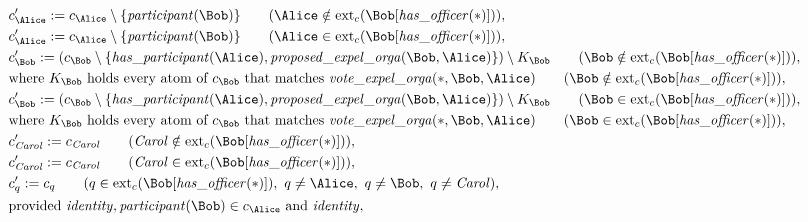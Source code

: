 \begin{align*}
&
c'_
{
\Alice
}
 := 
c_
{
\Alice
}
 \setminus 
\{
\mathit{\detokenize{
participant
}}
(
\Bob
)
\}
 \qquad (
\Alice
 \notin 
\mathrm{ext}_c(
\Bob
[
\mathit{\detokenize{
has_officer
}}
(
\ast
)
]
)
)
,\\
&
c'_
{
\Alice
}
 := 
c_
{
\Alice
}
 \setminus 
\{
\mathit{\detokenize{
participant
}}
(
\Bob
)
\}
 \qquad (
\Alice
 \in 
\mathrm{ext}_c(
\Bob
[
\mathit{\detokenize{
has_officer
}}
(
\ast
)
]
)
)
,\\
&
c'_
{
\Bob
}
 := 
(c_
{
\Bob
}
 \setminus 
\{
\mathit{\detokenize{
has_participant
}}
(
\Alice
)
,
\mathit{\detokenize{
proposed_expel_orga
}}
(
\Bob
,
\Alice
)
\}
) \setminus K_
{
\Bob
}
 \qquad (
\Bob
 \notin 
\mathrm{ext}_c(
\Bob
[
\mathit{\detokenize{
has_officer
}}
(
\ast
)
]
)
)
,\\
&
\text{where } K_
{
\Bob
}
 \text{ holds every atom of } c_
{
\Bob
}
 \text{ that matches } 
\mathit{\detokenize{
vote_expel_orga
}}
(
\ast
,
\Bob
,
\Alice
)
 \qquad (
\Bob
 \notin 
\mathrm{ext}_c(
\Bob
[
\mathit{\detokenize{
has_officer
}}
(
\ast
)
]
)
)
,\\
&
c'_
{
\Bob
}
 := 
(c_
{
\Bob
}
 \setminus 
\{
\mathit{\detokenize{
has_participant
}}
(
\Alice
)
,
\mathit{\detokenize{
proposed_expel_orga
}}
(
\Bob
,
\Alice
)
\}
) \setminus K_
{
\Bob
}
 \qquad (
\Bob
 \in 
\mathrm{ext}_c(
\Bob
[
\mathit{\detokenize{
has_officer
}}
(
\ast
)
]
)
)
,\\
&
\text{where } K_
{
\Bob
}
 \text{ holds every atom of } c_
{
\Bob
}
 \text{ that matches } 
\mathit{\detokenize{
vote_expel_orga
}}
(
\ast
,
\Bob
,
\Alice
)
 \qquad (
\Bob
 \in 
\mathrm{ext}_c(
\Bob
[
\mathit{\detokenize{
has_officer
}}
(
\ast
)
]
)
)
,\\
&
c'_
{
\mathit{Carol}
}
 := 
c_
{
\mathit{Carol}
}
 \qquad (
\mathit{Carol}
 \notin 
\mathrm{ext}_c(
\Bob
[
\mathit{\detokenize{
has_officer
}}
(
\ast
)
]
)
)
,\\
&
c'_
{
\mathit{Carol}
}
 := 
c_
{
\mathit{Carol}
}
 \qquad (
\mathit{Carol}
 \in 
\mathrm{ext}_c(
\Bob
[
\mathit{\detokenize{
has_officer
}}
(
\ast
)
]
)
)
,\\
&
c'_
q
 := 
c_
q
 \qquad (
q
 \in 
\mathrm{ext}_c(
\Bob
[
\mathit{\detokenize{
has_officer
}}
(
\ast
)
]
)
,\ 
q \neq 
\Alice
,\ 
q \neq 
\Bob
,\ 
q \neq 
\mathit{Carol}
)
,\\
&
\text{provided } 
\mathit{\detokenize{
identity
}}
,
\mathit{\detokenize{
participant
}}
(
\Bob
)
 \in c_
{
\Alice
}
 \text{ and } 
\mathit{\detokenize{
identity
}}
,
\mathit{\detokenize{
}}
\end{align*}
